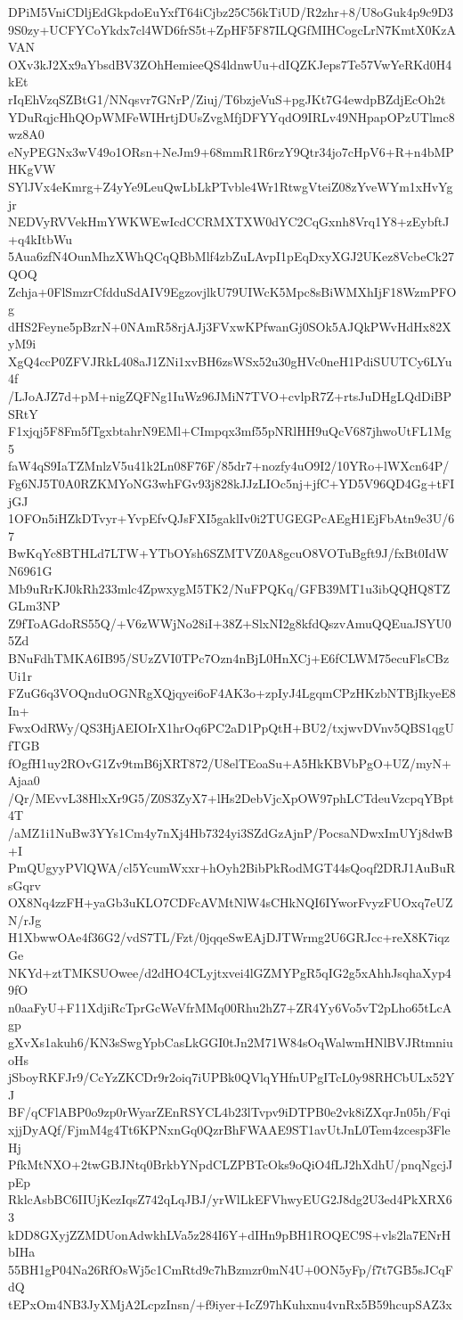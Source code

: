 DPiM5VniCDljEdGkpdoEuYxfT64iCjbz25C56kTiUD/R2zhr+8/U8oGuk4p9c9D3
9S0zy+UCFYCoYkdx7cl4WD6frS5t+ZpHF5F87ILQGfMIHCogcLrN7KmtX0KzAVAN
OXv3kJ2Xx9aYbsdBV3ZOhHemieeQS4ldnwUu+dIQZKJeps7Te57VwYeRKd0H4kEt
rIqEhVzqSZBtG1/NNqsvr7GNrP/Ziuj/T6bzjeVuS+pgJKt7G4ewdpBZdjEcOh2t
YDuRqjcHhQOpWMFeWIHrtjDUsZvgMfjDFYYqdO9IRLv49NHpapOPzUTlmc8wz8A0
eNyPEGNx3wV49o1ORsn+NeJm9+68mmR1R6rzY9Qtr34jo7cHpV6+R+n4bMPHKgVW
SYlJVx4eKmrg+Z4yYe9LeuQwLbLkPTvble4Wr1RtwgVteiZ08zYveWYm1xHvYgjr
NEDVyRVVekHmYWKWEwIcdCCRMXTXW0dYC2CqGxnh8Vrq1Y8+zEybftJ+q4kItbWu
5Aua6zfN4OunMhzXWhQCqQBbMlf4zbZuLAvpI1pEqDxyXGJ2UKez8VcbeCk27QOQ
Zchja+0FlSmzrCfdduSdAIV9EgzovjlkU79UIWcK5Mpc8sBiWMXhIjF18WzmPFOg
dHS2Feyne5pBzrN+0NAmR58rjAJj3FVxwKPfwanGj0SOk5AJQkPWvHdHx82XyM9i
XgQ4ccP0ZFVJRkL408aJ1ZNi1xvBH6zsWSx52u30gHVc0neH1PdiSUUTCy6LYu4f
/LJoAJZ7d+pM+nigZQFNg1IuWz96JMiN7TVO+cvlpR7Z+rtsJuDHgLQdDiBPSRtY
F1xjqj5F8Fm5fTgxbtahrN9EMl+CImpqx3mf55pNRlHH9uQcV687jhwoUtFL1Mg5
faW4qS9IaTZMnlzV5u41k2Ln08F76F/85dr7+nozfy4uO9I2/10YRo+lWXcn64P/
Fg6NJ5T0A0RZKMYoNG3whFGv93j828kJJzLIOc5nj+jfC+YD5V96QD4Gg+tFIjGJ
1OFOn5iHZkDTvyr+YvpEfvQJsFXI5gaklIv0i2TUGEGPcAEgH1EjFbAtn9e3U/67
BwKqYc8BTHLd7LTW+YTbOYsh6SZMTVZ0A8gcuO8VOTuBgft9J/fxBt0IdWN6961G
Mb9uRrKJ0kRh233mlc4ZpwxygM5TK2/NuFPQKq/GFB39MT1u3ibQQHQ8TZGLm3NP
Z9fToAGdoRS55Q/+V6zWWjNo28iI+38Z+SlxNI2g8kfdQszvAmuQQEuaJSYU05Zd
BNuFdhTMKA6IB95/SUzZVI0TPc7Ozn4nBjL0HnXCj+E6fCLWM75ecuFlsCBzUi1r
FZuG6q3VOQnduOGNRgXQjqyei6oF4AK3o+zpIyJ4LgqmCPzHKzbNTBjIkyeE8In+
FwxOdRWy/QS3HjAEIOIrX1hrOq6PC2aD1PpQtH+BU2/txjwvDVnv5QBS1qgUfTGB
fOgfH1uy2ROvG1Zv9tmB6jXRT872/U8elTEoaSu+A5HkKBVbPgO+UZ/myN+Ajaa0
/Qr/MEvvL38HlxXr9G5/Z0S3ZyX7+lHs2DebVjcXpOW97phLCTdeuVzcpqYBpt4T
/aMZ1i1NuBw3YYs1Cm4y7nXj4Hb7324yi3SZdGzAjnP/PocsaNDwxImUYj8dwB+I
PmQUgyyPVlQWA/cl5YcumWxxr+hOyh2BibPkRodMGT44sQoqf2DRJ1AuBuRsGqrv
OX8Nq4zzFH+yaGb3uKLO7CDFcAVMtNlW4sCHkNQI6IYworFvyzFUOxq7eUZN/rJg
H1XbwwOAe4f36G2/vdS7TL/Fzt/0jqqeSwEAjDJTWrmg2U6GRJcc+reX8K7iqzGe
NKYd+ztTMKSUOwee/d2dHO4CLyjtxvei4lGZMYPgR5qIG2g5xAhhJsqhaXyp49fO
n0aaFyU+F11XdjiRcTprGcWeVfrMMq00Rhu2hZ7+ZR4Yy6Vo5vT2pLho65tLcAgp
gXvXs1akuh6/KN3sSwgYpbCasLkGGI0tJn2M71W84sOqWalwmHNlBVJRtmniuoHs
jSboyRKFJr9/CcYzZKCDr9r2oiq7iUPBk0QVlqYHfnUPgITcL0y98RHCbULx52YJ
BF/qCFlABP0o9zp0rWyarZEnRSYCL4b23lTvpv9iDTPB0e2vk8iZXqrJn05h/Fqi
xjjDyAQf/FjmM4g4Tt6KPNxnGq0QzrBhFWAAE9ST1avUtJnL0Tem4zcesp3FleHj
PfkMtNXO+2twGBJNtq0BrkbYNpdCLZPBTcOks9oQiO4fLJ2hXdhU/pnqNgcjJpEp
RklcAsbBC6IIUjKezIqsZ742qLqJBJ/yrWlLkEFVhwyEUG2J8dg2U3ed4PkXRX63
kDD8GXyjZZMDUonAdwkhLVa5z284I6Y+dIHn9pBH1ROQEC9S+vls2la7ENrHbIHa
55BH1gP04Na26RfOsWj5c1CmRtd9c7hBzmzr0mN4U+0ON5yFp/f7t7GB5sJCqFdQ
tEPxOm4NB3JyXMjA2LcpzInsn/+f9iyer+IcZ97hKuhxnu4vnRx5B59hcupSAZ3x
